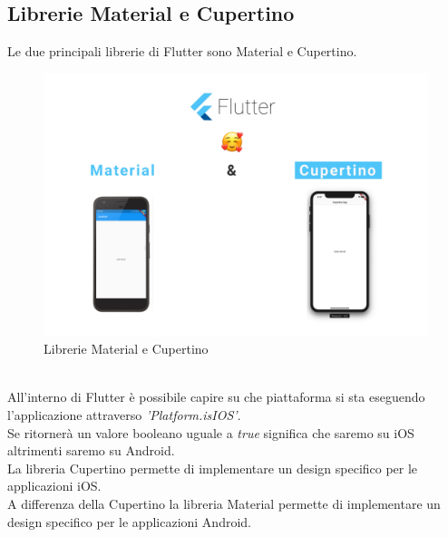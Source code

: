 \subsection{Librerie Material e Cupertino}
Le due principali librerie di Flutter sono Material e Cupertino. \cite{flutterd}\\
\begin{figure}[htbp]	
	\centering
	\includegraphics[width=14cm]{immagini/librerieCM.png}
	\caption{Librerie Material e Cupertino}
	\label{fig:Librerie Material e Cupertino}
\end{figure}
\\
All'interno di Flutter è possibile capire su che piattaforma si sta eseguendo l'applicazione attraverso \textit{'Platform.isIOS'}.\\
 Se ritornerà un valore booleano uguale a \textit{true} significa che saremo su iOS altrimenti saremo su Android.\\
La libreria Cupertino permette di implementare un design specifico per le applicazioni iOS.\\
A differenza della Cupertino la libreria Material permette di implementare un design specifico per le applicazioni Android.

